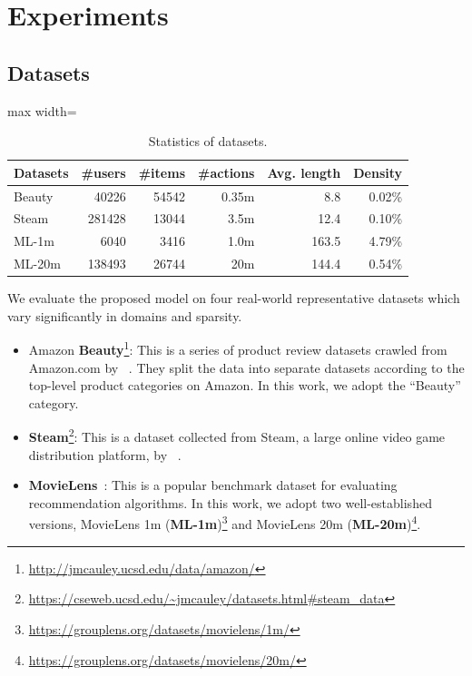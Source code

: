 \section{Experiments}





\subsection{Datasets}

\begin{table}
    \centering
    \caption{Statistics of datasets.}
    \label{tab:dataset}
    \begin{adjustbox}{max width=\linewidth}
    \begin{tabular}{l r r r r r}
    \toprule
    Datasets & \#users & \#items & \#actions & Avg. length &  Density\\
    \midrule
    Beauty & \num{40226} & \num{54542} & 0.35m & 8.8 & 0.02\% \\
    Steam & \num{281428} & \num{13044} & 3.5m & 12.4 & 0.10\% \\
    ML-1m & \num{6040} & \num{3416} & 1.0m & 163.5 & 4.79\% \\
    ML-20m & \num{138493} & \num{26744} & 20m & 144.4 & 0.54\%\\
    \bottomrule
    \end{tabular}
    \end{adjustbox}
\end{table}

We evaluate the proposed model on four real-world representative  datasets which vary significantly in domains and sparsity.

\begin{itemize}
    \item Amazon \textbf{Beauty}\footnote{\url{http://jmcauley.ucsd.edu/data/amazon/}}: This is a series of product review datasets crawled from Amazon.com by \citeauthor{McAuley:sigir2015}~\cite{McAuley:sigir2015}. 
    They split the data into separate datasets according to the top-level product categories on Amazon.
    In this work, we adopt the ``Beauty'' category.
    \item \textbf{Steam}\footnote{\url{https://cseweb.ucsd.edu/~jmcauley/datasets.html\#steam_data}}: 
    This is a dataset collected from Steam, a large online video game distribution platform, by \citeauthor{Kang:ICDM2018:SAS}~\cite{Kang:ICDM2018:SAS}.
    \item \textbf{MovieLens}~\cite{Harper:2015:MDH}: This is a popular benchmark dataset for evaluating recommendation algorithms.
    In this work, we adopt two well-established versions, MovieLens 1m (\textbf{ML-1m})\footnote{\url{https://grouplens.org/datasets/movielens/1m/}} and MovieLens 20m (\textbf{ML-20m})\footnote{\url{https://grouplens.org/datasets/movielens/20m/}}.
\end{itemize}

